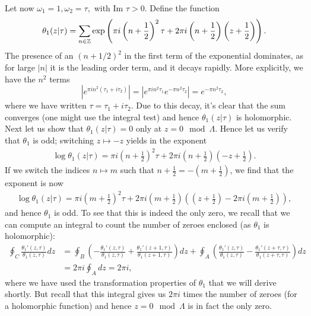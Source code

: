 \documentclass{../mathnotes}
\begin{document}
Let now $\omega_1=1,\omega_2=\tau,$ with $\text{Im }\tau>0$. Define the function
\[\theta_1(z|\tau)=\sum_{n\in\mathbb{Z}}\exp\left( \pi i\left( n+\frac{1}{2} \right)^2\tau+2\pi i\left( n+\frac{1}{2} \right)\left( z+\frac{1}{2} \right) \right).\]
The presence of an $(n+1/2)^2$ in the first term of the exponential dominates, as for large $|n|$ it is the leading order term, and it decays rapidly. More explicitly,
we have the $n^2$ terms
\[|e^{\pi in^2(\tau_1+i\tau_2)}|=|e^{\pi in^2\tau_1}e^{-\pi n^2\tau_2}|=e^{-\pi n^2\tau_2},\]
where we have written $\tau=\tau_1+i\tau_2$. Due to this decay, it's clear that the sum converges (one might use the integral test) and hence $\theta_1(z|\tau)$ is holomorphic. Next let us show
that $\theta_1(z|\tau)=0$ only at $z=0\mod\Lambda$.
Hence let us verify that $\theta_1$ is odd; switching $z\mapsto-z$ yields in the exponent
\begin{align*}
    \log\theta_1(z|\tau)=\pi i\left( n+\frac{1}{2} \right)^2\tau+2\pi i\left( n+\frac{1}{2} \right)\left( -z+\frac{1}{2} \right).
\end{align*}
If we switch the indices $n\mapsto m$ such that $n+\frac{1}{2}=-\left( m+\frac{1}{2} \right)$, we find that the exponent is now
\begin{align*}
    \log\theta_1(z|\tau)=\pi i\left( m+\frac{1}{2} \right)^2\tau+2\pi i\left( m+\frac{1}{2} \right)\left(\left( z+\frac{1}{2} \right)-2\pi i\left( m+\frac{1}{2} \right)\right),
\end{align*}
and hence $\theta_1$ is odd. To see that this is indeed the only zero, we recall that we can compute an integral to count the number of zeroes
enclosed (as $\theta_1$ is holomorphic):
\begin{align*}
    \oint_C \frac{\theta_1'(z,\tau)}{\theta_1(z, \tau)}  dz  &=  \oint_B \left( - \frac{\theta_1'(z,\tau)}{\theta_1(z, \tau)} + \frac{\theta_1'(z+1,\tau)}{\theta_1(z+1, \tau)} \right) dz   +  \oint_A \left( \frac{\theta_1'(z,\tau)}{\theta_1(z, \tau)} - \frac{\theta_1'(z+ \tau,\tau)}{\theta_1(z+ \tau, \tau)} \right) dz\\
    &=2\pi i\oint_A dz=2\pi i,
\end{align*}
where we have used the transformation properties of $\theta_1$ that we will derive shortly. But recall that this integral gives us $2\pi i$ times the number of zeroes (for a holomorphic
function) and hence $z=0\mod\Lambda$ is in fact the only zero.
\end{document}
